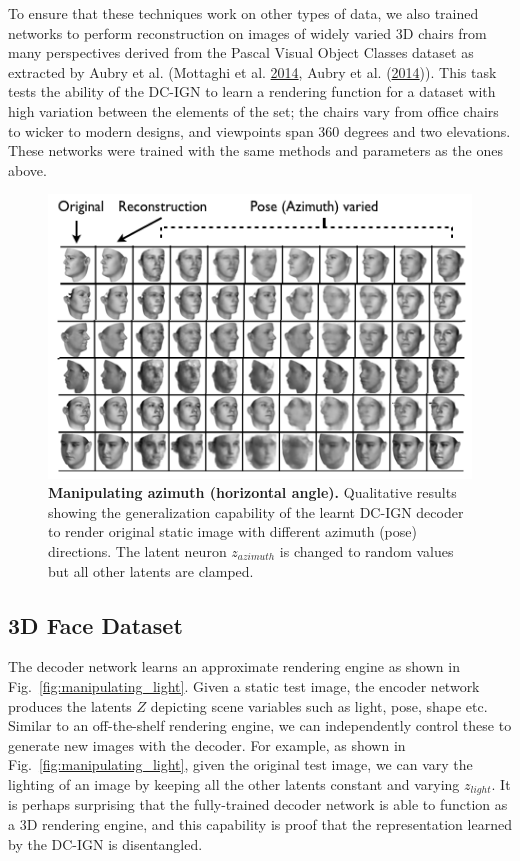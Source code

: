 \documentclass[12pt,twoside]{mitthesis}
\begin{document}
To ensure that these techniques work on other types of data, we also
trained networks to perform reconstruction on images of widely varied 3D
chairs from many perspectives derived from the Pascal Visual Object
Classes dataset as extracted by Aubry et al. (Mottaghi et al.
\protect\hyperlink{ref-mottaghi2014role}{2014}, Aubry et al.
(\protect\hyperlink{ref-aubry2014seeing}{2014})). This task tests the
ability of the DC-IGN to learn a rendering function for a dataset with
high variation between the elements of the set; the chairs vary from
office chairs to wicker to modern designs, and viewpoints span 360
degrees and two elevations. These networks were trained with the same
methods and parameters as the ones above.

\begin{figure}[htbp]
\centering
\includegraphics{../figures/azvaried.png}
\caption{\label{fig:manipulating_azimuth}\textbf{Manipulating azimuth
(horizontal angle).} Qualitative results showing the generalization
capability of the learnt DC-IGN decoder to render original static image
with different azimuth (pose) directions. The latent neuron
\(z_{azimuth}\) is changed to random values but all other latents are
clamped.}
\end{figure}

\subsection{3D Face Dataset}\label{sec:gen}

The decoder network learns an approximate rendering engine as shown in
Fig.~\ref{fig:manipulating_light}. Given a static test image, the
encoder network produces the latents \(Z\) depicting scene variables
such as light, pose, shape etc. Similar to an off-the-shelf rendering
engine, we can independently control these to generate new images with
the decoder. For example, as shown in Fig.~\ref{fig:manipulating_light},
given the original test image, we can vary the lighting of an image by
keeping all the other latents constant and varying \(z_{light}\). It is
perhaps surprising that the fully-trained decoder network is able to
function as a 3D rendering engine, and this capability is proof that the
representation learned by the DC-IGN is disentangled.
\end{document}
